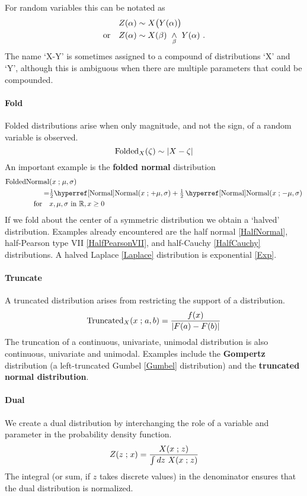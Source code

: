 For random variables this can be notated as 
\begin{align*}
Z(\alpha) &\sim X\bigl( Y(\alpha) \bigr)  \\ 
\text{or}\quad
Z(\alpha) & \sim X(\beta) \ \underset{\beta}{\wedge}\  Y(\alpha)  \ .
\end{align*}
The name `X-Y' is sometimes assigned to a compound of distributions `X' and `Y', although this is ambiguous when there are multiple parameters that could be compounded.


\paragraph*{Fold}
Folded distributions arise when only magnitude, and not the sign, of a random variable is observed. 
\[
\operatorname{Folded}_X(\zeta) \sim |X-\zeta |
\notag 
\] 
An important %
example is the {\bf folded normal} distribution
\begin{align*}
\op{FoldedNormal}&(x\given \mu,\sigma) 
\\ \notag
= & \half  { \opr{Normal}(x\given +\mu,\sigma) +  \half \opr{Normal}(x\given -\mu,\sigma) } \checked
 \\ \notag
\text{for} \quad & x, \mu, \sigma  \text{ in } \mathbb{R}, x\geq0
\end{align*}
If we fold about  the  center of a symmetric distribution we obtain a `halved' distribution. Examples already encountered are the half normal  \eqref{HalfNormal}, half-Pearson type VII  \eqref{HalfPearsonVII}, and half-Cauchy \eqref{HalfCauchy} distributions. A halved Laplace \eqref{Laplace} distribution is exponential \eqref{Exp}. 



\paragraph*{Truncate} 
A truncated distribution arises from restricting the support of a distribution.
\[
\operatorname{Truncated}_X(x\mathrel{;} a,b) = \frac{f(x)}{|F(a) - F(b)|} 
\notag
\]
 The truncation of a continuous, univariate, unimodal distribution is also continuous, univariate and unimodal.
  Examples include the {\bf Gompertz} distribution (a left-truncated Gumbel \eqref{Gumbel} distribution) and the
  {\bf truncated normal distribution}.

\paragraph*{Dual}
We create a dual distribution by interchanging the role of a variable and parameter in the probability density function.
\[
Z(z\mathrel{;} x) = \frac{ X(x\mathrel{;} z)}{ \int dz\  X(x\mathrel{;} z)} 
\notag
\]
The integral (or sum, if $z$ takes discrete values) in the denominator ensures that the dual distribution is normalized.



